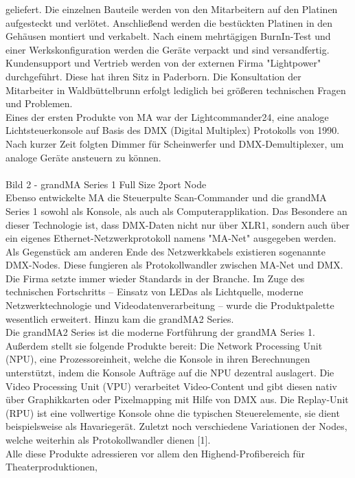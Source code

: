 \documentclass[11pt]{scrartcl}
\begin{document}
geliefert. Die einzelnen Bauteile werden von den
Mitarbeitern auf den Platinen aufgesteckt und verlötet.
Anschließend werden die bestückten Platinen in den Gehäusen montiert und verkabelt. Nach einem
mehrtägigen BurnIn-Test und einer Werkskonfiguration werden die Geräte verpackt und sind
versandfertig.\\
Kundensupport und Vertrieb werden von der externen Firma "Lightpower" durchgeführt. Diese hat
ihren Sitz in Paderborn. Die Konsultation der Mitarbeiter in Waldbüttelbrunn erfolgt lediglich bei
größeren technischen Fragen und Problemen.\\
Eines der ersten Produkte von MA war der Lightcommander24, eine analoge Lichtsteuerkonsole auf
Basis des DMX (Digital Multiplex) Protokolls von 1990. Nach kurzer Zeit folgten Dimmer für
Scheinwerfer und DMX-Demultiplexer, um analoge Geräte ansteuern zu können.\\
\\
Bild 2 - grandMA Series 1 Full Size 2port Node
\\
Ebenso entwickelte MA die Steuerpulte Scan-Commander und die grandMA Series 1 sowohl als
Konsole, als auch als Computerapplikation. Das Besondere an dieser Technologie ist, dass DMX-Daten
nicht nur über XLR1, sondern auch über ein eigenes Ethernet-Netzwerkprotokoll namens "MA-Net"
ausgegeben werden. Als Gegenstück am anderen Ende des Netzwerkkabels existieren sogenannte
DMX-Nodes. Diese fungieren als Protokollwandler zwischen MA-Net und DMX.\\
Die Firma setzte immer wieder Standards in der Branche. Im Zuge des technischen Fortschritts –
Einsatz von LEDas als Lichtquelle, moderne Netzwerktechnologie und Videodatenverarbeitung –
wurde die Produktpalette wesentlich erweitert. Hinzu kam die grandMA2 Series.\\
Die grandMA2 Series ist die moderne Fortführung der grandMA Series 1. Außerdem stellt sie
folgende Produkte bereit: Die Network Processing Unit (NPU), eine Prozessoreinheit, welche die
Konsole in ihren Berechnungen unterstützt, indem die Konsole Aufträge auf die NPU dezentral
auslagert. Die Video Processing Unit (VPU) verarbeitet Video-Content und gibt diesen nativ über
Graphikkarten oder Pixelmapping mit Hilfe von DMX aus. Die Replay-Unit (RPU) ist eine vollwertige
Konsole ohne die typischen Steuerelemente, sie dient beispielsweise als Havariegerät. Zuletzt noch
verschiedene Variationen der Nodes, welche weiterhin als Protokollwandler dienen [1].\\
Alle diese Produkte adressieren vor allem den Highend-Profibereich für Theaterproduktionen,
\end{document}

